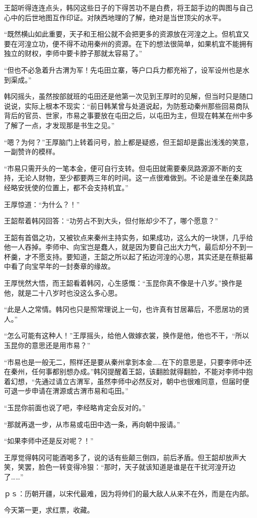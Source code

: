 王韶听得连连点头，韩冈这些日子的下得苦功不是白费，将王韶手边的舆图与自己心中的后世地图互作印证。对陕西地理的了解，绝对是当世顶尖的水平。

“既然横山如此重要，天子和王相公就不会把更多的资源放在河湟之上。但机宜又要在河湟立功，便不得不动用秦州的资源。在下的想法很简单，如果机宜不能拥有独立的财权，李师中要卡脖子那就太容易了。”

“但也不必急着升古渭为军！先屯田立寨，等户口兵力都充裕了，设军设州也是水到渠成。”

韩冈摇头，虽然按部就班的屯田还是他第一次见到王厚时的见解，但当时只是随口说说，实际上根本不现实：“前日韩某曾与处道说起，为防惹动秦州那些回易商队背后的官员、世家，市易之事要放在屯田之后，以屯田为主，但现在韩某在州中多了解了一点，才发现那是书生之见。”

“嗯？为何？”王厚脑门上转着问号，脸上都是疑惑，但王韶却是露出浅浅的笑意，一副赞许的模样。

“市易只需开头的一笔本金，便可自行支转。但屯田就需要秦凤路源源不断的支持，无论人财物，至少都要两三年的时间。这一点很难做到。不论是谁坐在秦凤路经略安抚使的位置上，都不会支持机宜。”

王厚惊道：“为什么？！”

王韶帮着韩冈回答：“功劳占不到大头，但付账却少不了，哪个愿意？”

王韶有首倡之功，又被钦点来秦州主持实务，如果成功，这么大的一块饼，几乎给他一人吞掉。李师中、向宝岂是蠢人，就是因为要自己出大力气，最后却分不到一杯羹，才不愿支持。要知道，王韶之所以起了拓边河湟的心思，其实还是在蔡挺幕中看了向宝早年的一封奏章的缘故。

王厚恍然大悟，而王韶看着韩冈，心生感慨：“玉昆你真不像是十八岁。”换作是他，就是二十八岁时也没这么多心思。

“此是人之常情。韩冈也只是照常理说上一句，也许真有甘居幕后，不愿居功的贤人。”

“怎么可能有这种人！”王厚摇头，给他人做嫁衣裳，换作是他，他也不干，“所以玉昆你的意思还是用市易？”

“市易也是一般无二，照样还是要从秦州拿到本金……在下的意思是，只要李师中还在秦州，任何事都别想办成。”韩冈提醒着王韶，该翻脸就得翻脸，不能对李师中抱着幻想，“先通过请立古渭军，虽然李师中必然反对，朝中也很难同意，但届时便可退一步申请在渭源或古渭市易和屯田。”

“玉昆你前面也说了吧，李经略肯定会反对的。”

“那就再退一步，从市易或屯田中选一条，再向朝中报请。”

“如果李师中还是反对呢？！”

王厚觉得韩冈可能酒喝多了，说的话有些颠三倒四，前后矛盾。但王韶却放声大笑，笑罢，脸色一转变得冷狠：“那时，天子就该知道是谁是在干扰河湟开边了……”

ｐｓ：历朝开疆，以宋代最难，因为将帅们的最大敌人从来不在外，而是在内部。

今天第一更，求红票，收藏。

